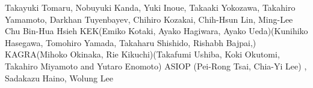  Takayuki Tomaru, Nobuyuki Kanda, Yuki Inoue, Takaaki Yokozawa, Takahiro Yamamoto, Darkhan Tuyenbayev, Chihiro Kozakai, Chih-Hsun Lin, Ming-Lee Chu
Bin-Hua Hsieh KEK(Emiko Kotaki, Ayako Hagiwara, Ayako Ueda)(Kunihiko Hasegawa, Tomohiro Yamada, Takaharu Shishido, Rishabh Bajpai,) KAGRA(Mihoko Okinaka, Rie Kikuchi)(Takafumi Ushiba, Koki Okutomi, Takahiro Miyamoto and Yutaro Enomoto)  ASIOP (Pei-Rong Tsai, Chia-Yi Lee) , Sadakazu Haino, Wolung Lee


%
